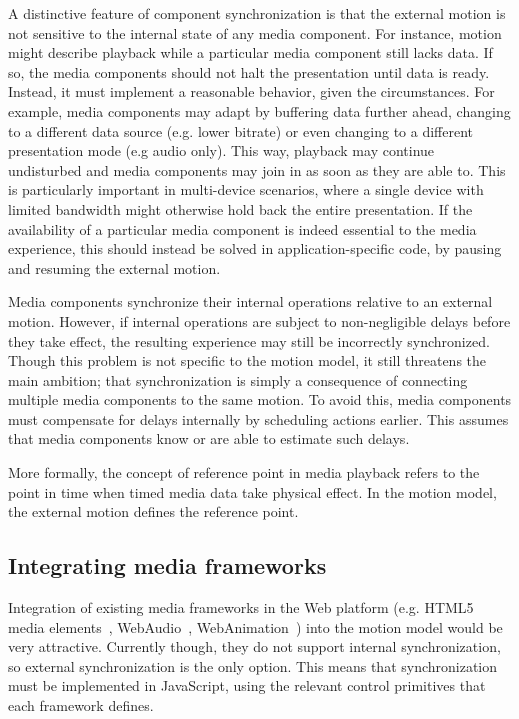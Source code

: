 A distinctive feature of component synchronization is that the external motion
is not sensitive to the internal state of any media component. For instance,
motion might describe playback while a particular media component still lacks
data. If so, the media components should not halt the presentation until data
is ready. Instead, it must implement a reasonable behavior, given the
circumstances. For example, media components may adapt by buffering data
further ahead, changing to a different data source (e.g. lower bitrate) or
even changing to a different presentation mode (e.g audio only). This way,
playback may continue undisturbed and media components may join in as soon as
they are able to. This is particularly important in multi-device scenarios,
where a single device with limited bandwidth might otherwise hold back the
entire presentation. If the availability of a particular media component is
indeed essential to the media experience, this should instead be solved in
application-specific code, by pausing and resuming the external motion.

\label{sec:referencepoint}
Media components synchronize their internal operations relative to an external
motion. However, if internal operations are subject to non-negligible delays
before they take effect, the resulting experience may still be incorrectly
synchronized. Though this problem is not specific to the motion model, it
still threatens the main ambition; that synchronization is simply a
consequence of connecting multiple media components to the same motion. To
avoid this, media components must compensate for delays internally by
scheduling actions earlier. This assumes that media components know or are
able to estimate such delays.

More formally, the concept of reference point in media playback refers to the
point in time when timed media data take physical effect. In the motion model,
the external motion defines the reference point.


\subsection {Integrating media frameworks}
\label{sec:html5sync}

Integration of existing media frameworks in the Web platform (e.g. HTML5 media
elements~\cite{html5media}, WebAudio~\cite{webaudio},
WebAnimation~\cite{webanimation}) into the motion model would be very
attractive. Currently though, they do not support internal synchronization, so
external synchronization is the only option. This means that synchronization
must be implemented in JavaScript, using the relevant control primitives that
each framework defines.


